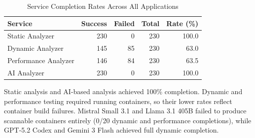\begin{table}[htbp]
    \centering
    \caption{Service Completion Rates Across All Applications}
    \label{tab:service_completion}
    \small
    \begin{tabular}{@{} l r r r r @{}}
        \toprule
        \textbf{Service} & \textbf{Success} & \textbf{Failed} & \textbf{Total} & \textbf{Rate (\%)} \\
        \midrule
        Static Analyzer & 230 & 0 & 230 & 100.0 \\
        Dynamic Analyzer & 145 & 85 & 230 & 63.0 \\
        Performance Analyzer & 146 & 84 & 230 & 63.5 \\
        AI Analyzer & 230 & 0 & 230 & 100.0 \\
        \bottomrule
    \end{tabular}
\end{table}

Static analysis and AI-based analysis achieved 100\% completion. Dynamic and performance testing required running containers, so their lower rates reflect container build failures. Mistral Small 3.1 and Llama 3.1 405B failed to produce scannable containers entirely (0/20 dynamic and performance completions), while GPT-5.2 Codex and Gemini 3 Flash achieved full dynamic completion.

\begin{table}[htbp]
    \centering
    \caption{Per-Model Service Completion (Successful / Total Attempted)}
    \label{tab:model_service}
    \small
    \setlength{\tabcolsep}{4pt}
\end{table}

